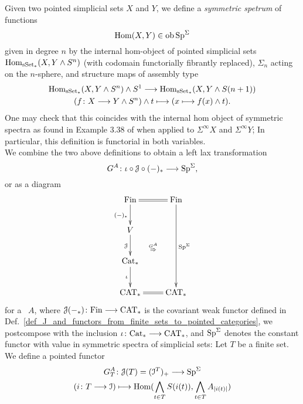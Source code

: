     \begin{defn}\label{def_left_lax_transform_G^A}
      Given two pointed simplicial sets $X$ and $Y$, we define a \emph{symmetric spetrum} of functions 
      \begin{displaymath}
        \operatorname{Hom}(X,Y) \in \operatorname{ob} \mathrm{Sp}^\Sigma
      \end{displaymath}
      given in degree $n$ by the internal hom-object of pointed simplicial sets $\operatorname{Hom}_{\mathrm{sSet}_*}(X,Y \wedge S^n)$ (with codomain functorially fibrantly replaced), $\Sigma_n$ acting on the $n$-sphere, and structure maps of assembly type
      \begin{gather*}
      \operatorname{Hom}_{\mathrm{sSet}_*}(X,Y \wedge S^n) \wedge S^1 \longrightarrow \operatorname{Hom}_{\mathrm{sSet}_*}(X,Y \wedge S(n+1))\\
      (f \colon X \longrightarrow Y \wedge S^n) \wedge t \longmapsto (x \longmapsto f(x) \wedge t).
      \end{gather*}
      One may check that this coincides with the internal hom object of symmetric spectra as found in Example 3.38 of \cite{schwede2012symmetric} when applied to $\Sigma^\infty X$ and $\Sigma^\infty Y$; In particular, this definition is functorial in both variables.\\
      We combine the two above definitions to obtain a left lax transformation
      \begin{displaymath}
        G^A \colon \iota \circ \mathcal{J} \circ (-)_* \longrightarrow \mathrm{Sp}^\Sigma,
      \end{displaymath}
      or as a diagram
      \begin{displaymath}
        \xymatrix{
          \Fin \ar@{=}[r] \ar[d]_{(-)_*} \ar@{}[rddd]|{\overset{G^A}{\Rightarrow}} & \Fin \ar[ddd]^{\Sp^{\Sigma}} \\
          V \ar[d]_{\cJ} & \\
          \Cat_* \ar[d]_{\iota} & \\
          \CAT_* \ar@{=}[r] & \CAT_*
        }
      \end{displaymath}
      for a \hring~$A$, where $\mathcal{J}(-_*) \colon \mathrm{Fin} \longrightarrow \mathrm{CAT}_*$ is the covariant weak functor defined in Def.~\ref{def_J_and_functors_from_finite_sets_to_pointed_categories}, we postcompose with the inclusion $\iota \colon \mathrm{Cat}_* \longrightarrow \mathrm{CAT}_*$, and $\mathrm{Sp}^\Sigma$ denotes the constant functor with value in symmetric spectra of simplicial sets: Let $T$ be a finite set. We define a pointed functor
      \begin{gather*}
        G^A_T \colon \cJ(T) = (\cI^T)_+ \to \SpS \\
        (i \colon T \to \cI) \mapsto %
          \Hom(\bigwedge_{t \in T} S(i(t)), \bigwedge_{t \in T} A_{\abs{i(t)}} )

\end{gather*}
\end{defn}

